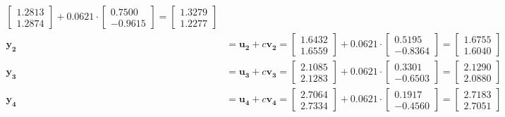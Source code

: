 \documentclass[a4paper, 12pt]{article}
\begin{document}
\begin{enumerate}
\begin{align*}
				\begin{bmatrix}
					1.2813\\
					1.2874
				\end{bmatrix} + 0.0621 \cdot 
				\begin{bmatrix}
					0.7500\\
					-0.9615
				\end{bmatrix} = 
				\begin{bmatrix}
					1.3279\\
					1.2277
				\end{bmatrix}\\
				\mathbf{y_2}&=\mathbf{u_2}+c\mathbf{v_2}=
				\begin{bmatrix}
					1.6432\\
					1.6559
				\end{bmatrix} + 0.0621 \cdot 
				\begin{bmatrix}
					0.5195\\
					-0.8364
				\end{bmatrix} = 
				\begin{bmatrix}
					1.6755\\
					1.6040
				\end{bmatrix}\\
				\mathbf{y_3}&=\mathbf{u_3}+c\mathbf{v_3}=
				\begin{bmatrix}
					2.1085\\
					2.1283
				\end{bmatrix} + 0.0621 \cdot 
				\begin{bmatrix}
					0.3301\\
					-0.6503
				\end{bmatrix} = 
				\begin{bmatrix}
					2.1290\\
					2.0880
				\end{bmatrix}\\
				\mathbf{y_4}&=\mathbf{u_4}+c\mathbf{v_4}=
				\begin{bmatrix}
					2.7064\\
					2.7334
				\end{bmatrix} + 0.0621 \cdot 
				\begin{bmatrix}
					0.1917\\
					-0.4560
				\end{bmatrix} = 
				\begin{bmatrix}
					2.7183\\
					2.7051
				\end{bmatrix}
			\end{align*}
	\end{enumerate} 
	
\end{document}
